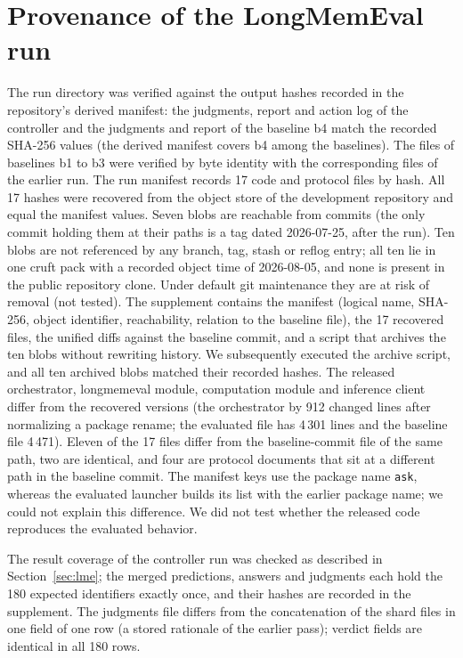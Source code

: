 \appendix
\section{Provenance of the LongMemEval run}
\label{app:prov}
The run directory was verified against the output hashes recorded in the repository's derived manifest: the judgments, report and action log of the controller and the judgments and report of the baseline b4 match the recorded SHA-256 values (the derived manifest covers b4 among the baselines). The files of baselines b1 to b3 were verified by byte identity with the corresponding files of the earlier run. The run manifest records 17 code and protocol files by hash. All 17 hashes were recovered from the object store of the development repository and equal the manifest values. Seven blobs are reachable from commits (the only commit holding them at their paths is a tag dated 2026-07-25, after the run). Ten blobs are not referenced by any branch, tag, stash or reflog entry; all ten lie in one cruft pack with a recorded object time of 2026-08-05, and none is present in the public repository clone. Under default git maintenance they are at risk of removal (not tested). The supplement contains the manifest (logical name, SHA-256, object identifier, reachability, relation to the baseline file), the 17 recovered files, the unified diffs against the baseline commit, and a script that archives the ten blobs without rewriting history. We subsequently executed the archive script, and all ten archived blobs matched their recorded hashes. The released orchestrator, longmemeval module, computation module and inference client differ from the recovered versions (the orchestrator by 912 changed lines after normalizing a package rename; the evaluated file has 4\,301 lines and the baseline file 4\,471). Eleven of the 17 files differ from the baseline-commit file of the same path, two are identical, and four are protocol documents that sit at a different path in the baseline commit. The manifest keys use the package name \texttt{ask}, whereas the evaluated launcher builds its list with the earlier package name; we could not explain this difference. We did not test whether the released code reproduces the evaluated behavior.

The result coverage of the controller run was checked as described in Section~\ref{sec:lme}; the merged predictions, answers and judgments each hold the 180 expected identifiers exactly once, and their hashes are recorded in the supplement. The judgments file differs from the concatenation of the shard files in one field of one row (a stored rationale of the earlier pass); verdict fields are identical in all 180 rows.

